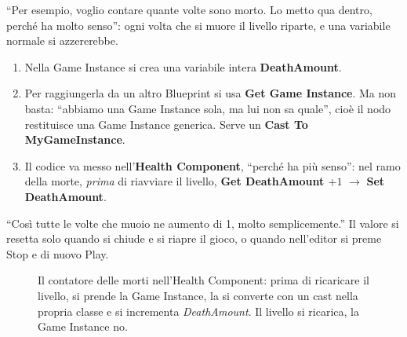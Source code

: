 ``Per esempio, voglio contare quante volte sono morto. Lo metto qua dentro,
perché ha molto senso'': ogni volta che si muore il livello riparte, e una
variabile normale si azzererebbe.
\begin{enumerate}
  \item Nella Game Instance si crea una variabile intera \textbf{DeathAmount}.
  \item Per raggiungerla da un altro Blueprint si usa \textbf{Get Game
        Instance}. Ma non basta: ``abbiamo una
        Game Instance sola, ma lui non sa quale'', cioè il nodo restituisce una
        Game Instance generica. Serve un \textbf{Cast To MyGameInstance}.
  \item Il codice va messo nell'\textbf{Health Component}, ``perché ha più
        senso'': nel ramo della morte, \emph{prima} di riavviare il livello,
        \textbf{Get DeathAmount $+ 1$} $\rightarrow$ \textbf{Set DeathAmount}.
\end{enumerate}
``Così tutte le volte che muoio ne aumento di 1, molto semplicemente.'' Il valore
si resetta solo quando si chiude e si riapre il gioco, o quando nell'editor si
preme Stop e di nuovo Play.

\begin{figure}[htbp]
\centering
{}
\caption{Il contatore delle morti nell'Health Component: prima di ricaricare il
livello, si prende la Game Instance, la si converte con un cast nella propria
classe e si incrementa \emph{DeathAmount}. Il livello si ricarica, la Game
Instance no.}
\label{gd13:fig:game-instance}
\end{figure}

